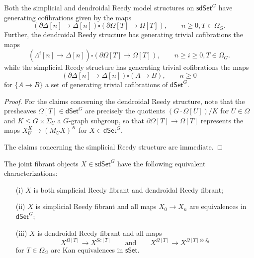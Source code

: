 \documentclass[a4paper,10pt,draft]{article}%
\numberwithin{equation}{section}%
\numberwithin{figure}{section}
\begin{document}
\begin{proposition}
	Both the simplicial and dendroidal Reedy model structures on 
	$\mathsf{sdSet}^G$ have generating cofibrations given by the maps
\[
	\left(\partial \Delta [n] \to \Delta[n]\right)
		\square
	\left(\partial \Omega[T] \to \Omega[T]\right),
	\qquad
	n\geq 0, T \in \Omega_G.
\]
Further, the dendroidal Reedy structure has generating trivial cofibrations the maps
\begin{equation}\label{DENDTRIVCOF EQ}
	\left(\Lambda^i [n] \to \Delta[n]\right)
		\square
	\left(\partial \Omega[T] \to \Omega[T]\right),
	\qquad
	n\geq i \geq 0, T \in \Omega_G.
\end{equation}
while the simplicial Reedy structure has generating trivial cofibrations the maps
\begin{equation}\label{SIMPTRIVCOF EQ}
	\left(\partial \Delta [n] \to \Delta[n]\right)
		\square
	\left(A \to B\right),
	\qquad
	n\geq 0
\end{equation}
for $\{A \to B\}$ a set of generating trivial cofibrations of
$\mathsf{dSet}^G$.
\end{proposition}

\begin{proof}
	For the claims concerning the dendroidal Reedy structure, 
	note that the presheaves $\Omega[T] \in \mathsf{dSet}^G$
	are precisely the quotients $(G \cdot \Omega[U])/K$ for $U\in \Omega$ and $K \leq G \times \Sigma_U$ a $G$-graph subgroup,
	so that $\partial \Omega[T] \to \Omega[T]$
	represents the maps $X_U^K \to (M_U X)^K$ for $X \in \mathsf{dSet}^G$.
	
	The claims concerning the simplicial Reedy structure are immediate.
\end{proof}


\begin{corollary}\label{JOINTFIBCHAR COR}
The joint fibrant objects $X \in \mathsf{sdSet}^G$ have the following equivalent characterizations:
\begin{itemize}
	\item[(i)] $X$ is both simplicial Reedy fibrant and dendroidal Reedy fibrant;
	\item[(ii)] $X$ is simplicial Reedy fibrant and all maps 
	$X_0 \to X_n$ are equivalences in $\mathsf{dSet}^{G}$;
	\item[(iii)] $X$ is dendroidal Reedy fibrant and all maps
\[
	X^{\Omega[T]} \to X^{Sc[T]}
\qquad \text{and} \qquad
	X^{\Omega[T]} \to X^{\Omega[T]\otimes J_d}
\]
for $T \in \Omega_G$ are Kan equivalences in $\mathsf{sSet}$.
\end{itemize}
\end{corollary}
\end{document}
